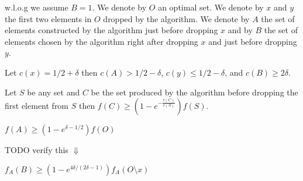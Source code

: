 w.l.o.g we assume $B = 1$.
We denote by $O$ an optimal set. 
We denote by $x$ and $y$ the first two elements in $O$ dropped by the algorithm.  
We denote by $A$ the set of elements constructed by the algorithm just before
dropping $x$ and by $B$ the set of elements chosen by the algorithm right after dropping $x$ 
and just before dropping $y$.

\begin{figure}[h]
\end{figure}

Let $c(x) = 1/2 + \delta$ 
then $c(A) > 1/2 - \delta$, $c(y) \leq 1/2 - \delta$, and $c(B) \geq 2\delta$.

\begin{lemma}
Let $S$ be any set and $C$ be the set produced by the algorithm 
before dropping the first element from $S$ then $f(C) \geq (1 - e^{-\frac{c(C)}{c(S)}})f(S)$.  
\end{lemma} 

\begin{observation}
$f(A) \geq (1 - e^{\delta - 1/2})f(O)$
\end{observation}

TODO verify this $\Downarrow$
\begin{observation}
$f_A(B) \geq (1 - e^{4\delta / (2\delta - 1)})f_A(O \setminus x)$
\end{observation}

